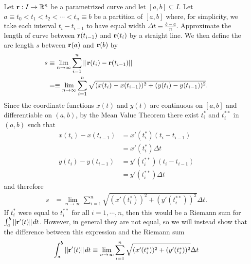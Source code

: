 \documentclass[12pt,letterpaper,reqno]{article}
\numberwithin{equation}{section}
\newcommand{\R}{\ensuremath{\mathbb R}}
\newcommand{\bbr}{{\bf r}}
\newcommand{\fixme}[1]{{\color{orange}{[#1]}}}
\begin{document}
{\begin{pf}
\fixme{This proof references an idea here and there which are most likely unfamiliar. Attempts to give a rough explanation are given, but may not be entirely satisfactory.} Let $\bbr:I \to \R^n$ be a parametrized curve and let $[a,b] \subseteq I$. Let $a\equiv t_0<t_1<t_2	<\cdots<t_n\equiv b$ be a partition of $[a,b]$ where, for simplicity, we take each interval $t_i-t_{i-1}$ to have equal width $\Delta t\equiv \frac{b-a}{n}$. Approximate the length of curve between $\bbr(t_{i-1})$ and $\bbr(t_i)$ by a straight line. We then define the arc length $s$ between $\bbr(a)$ and $\bbr(b)$ by
\begin{align*}
	s&\equiv \lim_{n \to \infty}\sum_{i=1}^n||\bbr(t_i)-\bbr(t_{i-1})|| \\
	&=\equiv \lim_{n \to \infty}\sum_{i=1}^n\sqrt{(x(t_i)-x(t_{i-1}))^2+(y(t_i)-y(t_{i-1}))^2}.
\end{align*}
Since the coordinate functions $x(t)$ and $y(t)$ are continuous on $[a,b]$ and differentiable on $(a,b)$, by the Mean Value Theorem there exist $t_i^*$ and $t_i^{**}$ in $(a,b)$ such that
\begin{align*}
	x(t_i)-x(t_{i-1})&=x'(t_i^*)(t_i-t_{i-1}) \\
	&=x'(t_i^*)\Delta t \\
	y(t_i)-y(t_{i-1})&=y'(t_i^{**})(t_i-t_{i-1}) \\
	&=y'(t_i^{**})\Delta t
\end{align*}
and therefore
\begin{align*}
	s&=\lim_{n \to \infty}\sum_{i=1}^n\sqrt{(x'(t_i^*))^2+(y'(t_i^{**}))^2}\Delta t.
\end{align*}
If $t_i^*$ were equal to $t_i^{**}$ for all $i=1,\cdots,n$, then this would be a Riemann sum for $\int_a^b||\bbr'(t)||dt$. However, in general they are not equal, so we will instead show that the difference between this expression and the Riemann sum
\begin{align*}
\int_a^b||\bbr'(t)||dt\equiv\lim_{n \to \infty}\sum_{i=1}^n\sqrt{(x'(t_i^*))^2+(y'(t_i^*))^2}\Delta t	
\end{align*}

\end{pf}}
\end{document}
